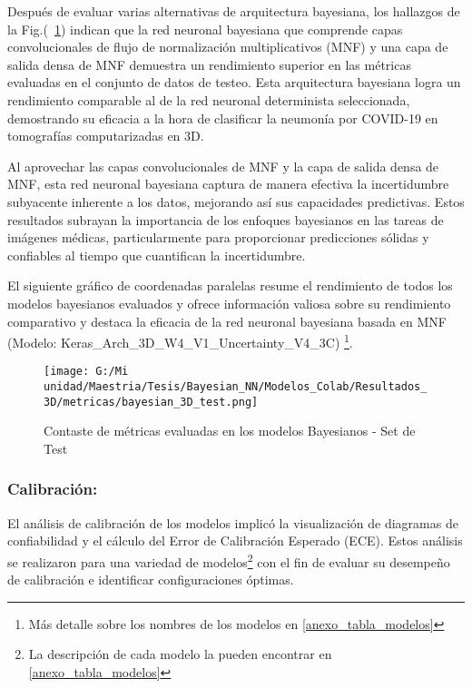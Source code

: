 \documentclass[10pt, oneside, a4paper]{article}
\begin{document}
	Después de evaluar varias alternativas de arquitectura bayesiana, los hallazgos de la Fig.(~\ref{fig:bayesianas_test}) indican que la red neuronal bayesiana que comprende capas convolucionales de flujo de normalización multiplicativos (MNF) y una capa de salida densa de MNF demuestra un rendimiento superior en las métricas evaluadas en el conjunto de datos de testeo. Esta arquitectura bayesiana logra un rendimiento comparable al de la red neuronal determinista seleccionada, demostrando su eficacia a la hora de clasificar la neumonía por COVID-19 en tomografías computarizadas en 3D. 
	
	Al aprovechar las capas convolucionales de MNF y la capa de salida densa de MNF, esta red neuronal bayesiana captura de manera efectiva la incertidumbre subyacente inherente a los datos, mejorando así sus capacidades predictivas. Estos resultados subrayan la importancia de los enfoques bayesianos en las tareas de imágenes médicas, particularmente para proporcionar predicciones sólidas y confiables al tiempo que cuantifican la incertidumbre. 
	
	El siguiente gráfico de coordenadas paralelas resume el rendimiento de todos los modelos bayesianos evaluados y ofrece información valiosa sobre su rendimiento comparativo y destaca la eficacia de la red neuronal bayesiana basada en MNF (Modelo: Keras\_Arch\_3D\_W4\_V1\_Uncertainty\_V4\_3C) \footnote{Más detalle sobre los nombres de los modelos en \ref{anexo_tabla_modelos}}.
	
	\begin{figure}[H]
	\centering
	\texttt{[image: G:/Mi unidad/Maestria/Tesis/Bayesian\_NN/Modelos\_Colab/Resultados\_3D/metricas/bayesian\_3D\_test.png]}
	\caption{Contaste de métricas evaluadas en los modelos Bayesianos - Set de Test}
	\label{fig:bayesianas_test}
	\end{figure}
	

	\subsubsection{Calibración:} \label{r_calibracion_3d}

	El análisis de calibración de los modelos implicó la visualización de diagramas de confiabilidad y el cálculo del Error de Calibración Esperado (ECE). Estos análisis se realizaron para una variedad de modelos\footnote{La descripción de cada modelo la pueden encontrar en \ref{anexo_tabla_modelos}} con el fin de evaluar su desempeño de calibración e identificar configuraciones óptimas.
	
\end{document}

